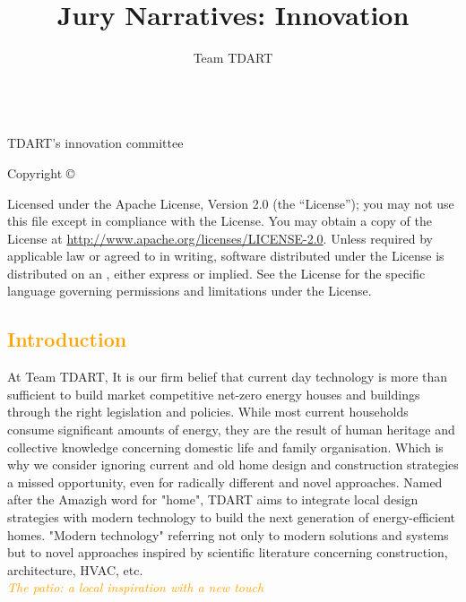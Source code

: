 \documentclass[justified]{tufte-book}
\author{Team TDART\hfill \usebox{\titleimage} }
\title[Jury Narratives]{Jury Narratives: Innovation}
\newcommand{\monthyear}{%
	\ifcase\month\or January\or February\or March\or April\or May\or June\or
	July\or August\or September\or October\or November\or
	December\fi\space\number\year
}
\begin{document}
	\frontmatter
	\maketitle
	\newpage
	\begin{fullwidth}

    \begin{center}
	       \\\vspace{.2cm}
	      TDART's innovation committee
	  \end{center}
		
		\vfill
		\thispagestyle{empty}
		\setlength{\parindent}{0pt}
		\setlength{\parskip}{\baselineskip}
		Copyright \copyright\ \the\year\ \thanklessauthor
		
		\par{}
		
		
		
		\par Licensed under the Apache License, Version 2.0 (the ``License''); you may not
		use this file except in compliance with the License. You may obtain a copy
		of the License at \url{http://www.apache.org/licenses/LICENSE-2.0}. Unless
		required by applicable law or agreed to in writing, software distributed
		under the License is distributed on an , either express or implied. See the
		License for the specific language governing permissions and limitations
		under the License.
		
	\end{fullwidth}
	
	
	\textcolor{orange}{\chapter*{Introduction}}
	At Team TDART, It is our firm belief that current day technology is more than sufficient to build market competitive net-zero energy houses and buildings through the right legislation and policies. While most current households consume significant amounts of energy, they are the result of human heritage and collective knowledge concerning domestic life and family organisation. Which is why we consider ignoring current and old home design and construction strategies a missed opportunity, even for radically different and novel approaches. Named after the Amazigh word for "home", TDART aims to integrate local design strategies with modern technology to build the next generation of energy-efficient homes. "Modern technology" referring not only to modern solutions and systems but to novel approaches inspired by scientific  literature concerning construction, architecture, HVAC, etc. 
	\vspace*{3cm}\\
	\textcolor{orange}{\textit{\Huge{The patio: a local inspiration with a new touch}}}
	\vspace*{2cm}\\
\end{document}
